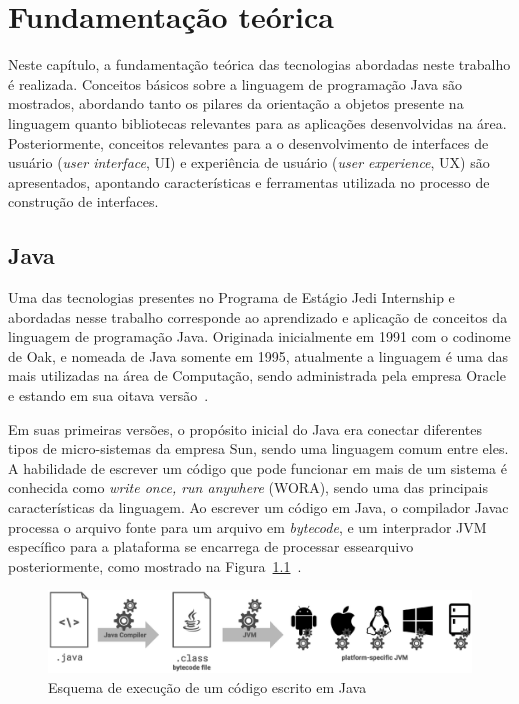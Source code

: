\chapter{Fundamentação teórica}
\label{cap:fundamentacao-teorica}

Neste capítulo, a fundamentação teórica das tecnologias abordadas neste trabalho é realizada. Conceitos básicos sobre a linguagem de programação Java são mostrados, abordando tanto os pilares da orientação a objetos presente na linguagem quanto bibliotecas relevantes para as aplicações desenvolvidas na área. Posteriormente, conceitos relevantes para a o desenvolvimento de interfaces de usuário (\textit{user interface}, UI) e experiência de usuário (\textit{user experience}, UX) são apresentados, apontando características e ferramentas utilizada no processo de construção de interfaces.

\section{Java}
\label{sec:java}

Uma das tecnologias presentes no Programa de Estágio Jedi Internship e abordadas nesse trabalho corresponde ao aprendizado e aplicação de conceitos da linguagem de programação Java. Originada inicialmente em 1991 com o codinome de Oak, e nomeada de Java somente em 1995, atualmente a linguagem é uma das mais utilizadas na área de Computação, sendo administrada pela empresa Oracle e estando em sua oitava versão~\cite{ocastudyguide-2015}.

Em suas primeiras versões, o propósito inicial do Java era conectar diferentes tipos de micro-sistemas da empresa Sun, sendo uma linguagem comum entre eles. A habilidade de escrever um código que pode funcionar em mais de um sistema é conhecida como \textit{write once, run anywhere} (WORA), sendo uma das principais características da linguagem. Ao escrever um código em Java, o compilador Javac processa o arquivo fonte para um arquivo em \textit{bytecode}, e um interprador JVM específico para a plataforma se encarrega de processar essearquivo posteriormente, como mostrado na Figura~\ref{fig:java-fluxo}~\cite{ocastudyguide-2015}.

\begin{figure}[htb!]
  \centering
  \caption{Esquema de execução de um código escrito em Java}
  \label{fig:java-fluxo}
  \includegraphics[width=\textwidth, keepaspectratio=true]{img/java-fluxo}
\end{figure}

